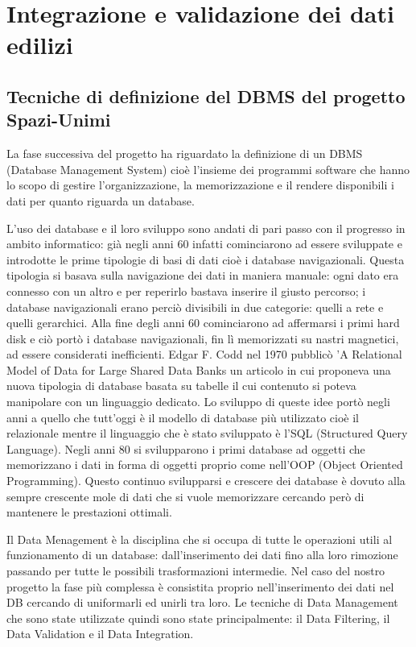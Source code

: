 \documentclass[12pt]{report}
\begin{document}
\vspace{5mm} %


\chapter{Integrazione e validazione dei dati edilizi}
\label{cap2}

\section{Tecniche di definizione del DBMS del progetto Spazi-Unimi}

La fase successiva del progetto ha riguardato la definizione di un DBMS (Database Management System) cioè l'insieme dei programmi software che hanno lo scopo di gestire l'organizzazione, la memorizzazione e il rendere disponibili i dati per quanto riguarda un database.

\vspace{5mm} %

L'uso dei database e il loro sviluppo sono andati di pari passo con il progresso in ambito informatico: già negli anni 60 infatti cominciarono ad essere sviluppate e introdotte le prime tipologie di basi di dati cioè i database navigazionali. 
Questa tipologia si basava sulla navigazione dei dati in maniera manuale: ogni dato era connesso con un altro e per reperirlo bastava inserire il giusto percorso; i database navigazionali erano perciò divisibili in due categorie: quelli a rete e quelli gerarchici.
Alla fine degli anni 60 cominciarono ad affermarsi i primi hard disk e ciò portò i database navigazionali, fin lì memorizzati su nastri magnetici, ad essere considerati inefficienti. 
Edgar F. Codd nel 1970 pubblicò 'A Relational Model of Data for Large Shared Data Banks un articolo in cui proponeva una nuova tipologia di database basata su tabelle il cui contenuto si poteva manipolare con un linguaggio dedicato.
Lo sviluppo di queste idee portò negli anni a quello che tutt'oggi è il modello di database più utilizzato cioè il relazionale mentre il linguaggio che è stato sviluppato è l'SQL (Structured Query Language).
Negli anni 80 si svilupparono i primi database ad oggetti che memorizzano i dati in forma di oggetti proprio come nell'OOP (Object Oriented Programming).
Questo continuo svilupparsi e crescere dei database è dovuto alla sempre crescente mole di dati che si vuole memorizzare cercando però di mantenere le prestazioni ottimali. 

Il Data Menagement è la disciplina che si occupa di tutte le operazioni utili al funzionamento di un database: dall'inserimento dei dati fino alla loro rimozione passando per tutte le possibili trasformazioni intermedie.
Nel caso del nostro progetto la fase più complessa è consistita proprio nell'inserimento dei dati nel DB cercando di uniformarli ed unirli tra loro. 
Le tecniche di Data Management che sono state utilizzate quindi sono state principalmente: il Data Filtering, il Data Validation e il Data Integration.
\end{document}
